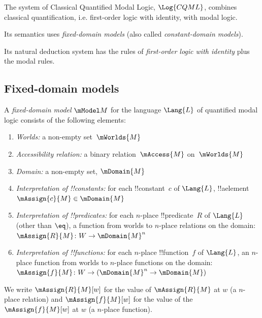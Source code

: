 \documentclass[../../../../include/open-logic-section]{subfiles}
\begin{document}


The system of Classical Quantified Modal Logic, $\Log{CQML}$,
combines classical quantification, i.e. first-order logic with 
identity, with modal logic. 

Its semantics uses \emph{fixed-domain models} (also 
called \emph{constant-domain models}).

Its natural deduction system has the rules of \emph{first-order 
logic with identity} plus the modal rules.

\subsection{Fixed-domain models}

\begin{defn}
    A \emph{fixed-domain model} $\mModel M$ for the language $\Lang{L}$ 
    of quantified modal logic consists of the following elements:
    \begin{enumerate}
    \item \emph{Worlds:} a non-empty set~$\mWorlds{M}$
    \item \emph{Accessibility relation:} a binary relation~$\mAccess{M}$ on~$\mWorlds{M}$
    \item \emph{Domain:} a non-empty set, $\mDomain{M}$
\item \emph{Interpretation of !!{constant}s:} for each !!{constant}~$c$ of
  $\Lang{L}$, !!a{element} $\mAssign{c}{M} \in \mDomain{M}$
\item \emph{Interpretation of !!{predicate}s:} for each $n$-place
  !!{predicate}~$R$ of $\Lang{L}$ (other than $\eq$), a function 
  from worlds to $n$-place
  relations on the domain: $\mAssign{R}{M} \colon W \to \mDomain{M}^n$
\item \emph{Interpretation of !!{function}s:} for each $n$-place
  !!{function}~$f$ of $\Lang{L}$, an $n$-place function from worlds 
  to $n$-place functions on the domain: $\mAssign{f}{M} \colon W \to 
  (\mDomain{M}^n \to \mDomain{M})$

\end{enumerate}

We write $\mAssign{R}{M}[w]$ for the value of $\mAssign{R}{M}$ at $w$ (a $n$-place relation) and $\mAssign{f}{M}[w]$ for the value of the 
$\mAssign{f}{M}[w]$ at $w$ (a $n$-place function). 
\end{defn}
\end{document}
